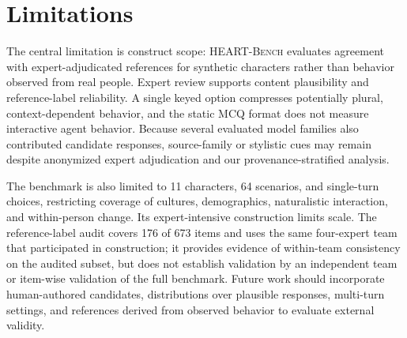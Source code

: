 \documentclass[11pt]{article}
\newcommand{\ourbench}[0]{\textsc{HEART-Bench}\xspace}
\begin{document}
\section*{Limitations}
\label{sec:limitations}
The central limitation is construct scope: \ourbench evaluates agreement with expert-adjudicated references for synthetic characters rather than behavior observed from real people. Expert review supports content plausibility and reference-label reliability. A single keyed option compresses potentially plural, context-dependent behavior, and the static MCQ format does not measure interactive agent behavior. Because several evaluated model families also contributed candidate responses, source-family or stylistic cues may remain despite anonymized expert adjudication and our provenance-stratified analysis.

The benchmark is also limited to 11 characters, 64 scenarios, and single-turn choices, restricting coverage of cultures, demographics, naturalistic interaction, and within-person change. Its expert-intensive construction limits scale. The reference-label audit covers 176 of 673 items and uses the same four-expert team that participated in construction; it provides evidence of within-team consistency on the audited subset, but does not establish validation by an independent team or item-wise validation of the full benchmark. Future work should incorporate human-authored candidates, distributions over plausible responses, multi-turn settings, and references derived from observed behavior to evaluate external validity.






\end{document}

